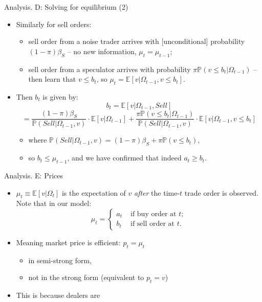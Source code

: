 \documentclass[english,10pt
,aspectratio=169
]{beamer}
\begin{document}
\begin{frame}{Analysis. D: Solving for equilibrium (2)}
	\begin{itemize}
		\item Similarly for \alert{sell orders}:
		\begin{itemize}
			\item sell order from a noise trader arrives with [unconditional] probability $(1-\pi)\beta_S$ -- no new information, $\mu_t = \mu_{t-1}$;
			\item sell order from a speculator arrives with probability $\pi \mathbb{P}(v \leq b_t | \Omega_{t-1})$ -- then learn that $v \leq b_t$, so $\mu_t = \mathbb{E} [v | \Omega_{t-1}, v \leq b_t]$.
		\end{itemize}
		\item Then $b_t$ is given by:
		$$ b_t = \mathbb{E}[v|\Omega_{t-1}, Sell] $$
		$$ = \frac{(1-\pi)\beta_S}{\mathbb{P}(Sell|\Omega_{t-1}, v)} \cdot \mathbb{E}[v|\Omega_{t-1}] + \frac{\pi \mathbb{P}(v \leq b_t | \Omega_{t-1})}{\mathbb{P}(Sell|\Omega_{t-1}, v)} \cdot \mathbb{E} [v | \Omega_{t-1}, v \leq b_t] $$
		\begin{itemize}
			\item where $\mathbb{P}(Sell|\Omega_{t-1}, v) = (1-\pi) \beta_S + \pi \mathbb{P}(v\leq b_t)$,
			\item so $b_t \leq \mu_{t-1}$, and we have confirmed that indeed $a_t \geq b_t$.
		\end{itemize}
	\end{itemize}
\end{frame}


\begin{frame}{Analysis. E: Prices}
	\begin{itemize}
		\item $\mu_t \equiv \mathbb{E}[v | \Omega_t]$ is the expectation of $v$ \textit{after} the time-$t$ trade order is observed. Note that in our model:
		$$\mu_t = \begin{cases}
			a_t & \text{ if buy order at } t;
			\\
			b_t & \text{ if sell order at } t.
		\end{cases} $$
		\item Meaning market price is efficient: $p_t = \mu_t$
		\begin{itemize}
			\item in \alert{semi-strong} form,
			\item not in the \alert{strong} form (equivalent to $p_t = v$)
		\end{itemize}
		\item This is because dealers are 
	\end{itemize}
\end{frame}
\end{document}
